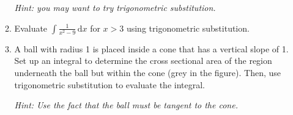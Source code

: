 \begin{enumerate}
\begin{enumerate}
\begin{minipage}{0.5\textwidth}
        \emph{Hint: you may want to try trigonometric substitution.}
        \end{minipage}%
        \begin{minipage}{0.5\textwidth}
            \begin{center}
            \end{center}
    	\end{minipage}

        \item Evaluate $\int \frac{1}{x^2 - 9}\,\mathrm d x$ for $x > 3$ using trigonometric substitution.
        
        \item \phantom{x}
        
        \begin{minipage}{0.5\textwidth}
        A ball with radius 1 is placed inside a cone that has a vertical slope of 1. Set up an integral to determine the cross sectional area of the region underneath the ball but within the cone (grey in the figure).
        Then, use trigonometric substitution to evaluate the integral.
        
        \textit{Hint: Use the fact that the ball must be tangent to the cone.}

        \end{minipage}%
        \begin{minipage}{0.5\textwidth}
            \begin{center}
            \end{center}
    	\end{minipage}
    \end{enumerate}



\end{enumerate}
